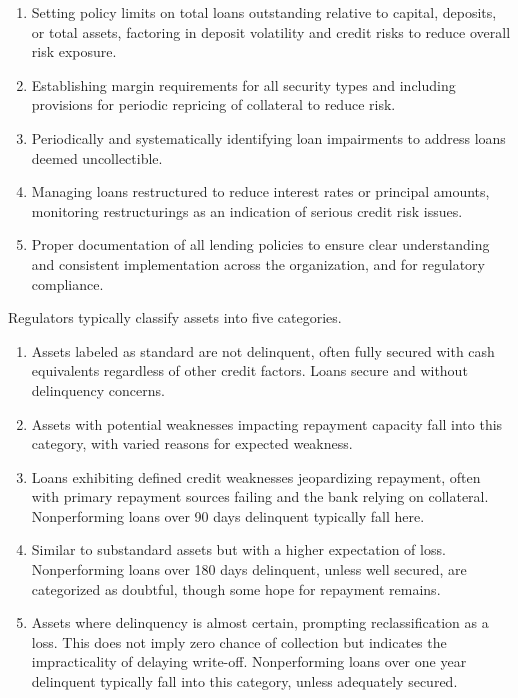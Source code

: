 \begin{enumerate}
delinquencies, including reporting to the board and determining potential losses
and alternative repayment plans.
\item {} Setting policy limits on total
loans outstanding relative to capital, deposits, or total assets, factoring in
deposit volatility and credit risks to reduce overall risk exposure.
\item {} Establishing margin requirements for
all security types and including provisions for periodic repricing of collateral
to reduce risk.
\item {} Periodically and systematically identifying
loan impairments to address loans deemed uncollectible.
\item {} Managing loans restructured to reduce
interest rates or principal amounts, monitoring restructurings as an indication
of serious credit risk issues.
\item {} Proper documentation of all lending
policies to ensure clear understanding and consistent implementation across the
organization, and for regulatory compliance.
\end{enumerate}


Regulators typically classify assets into five categories.

\begin{enumerate}
\item {} Assets labeled as standard are not delinquent,
often fully secured with cash equivalents regardless of other credit factors.
Loans secure and without delinquency concerns.
\item {} Assets with potential weaknesses
impacting repayment capacity fall into this category, with varied reasons for
expected weakness.
\item {} Loans exhibiting defined credit weaknesses
jeopardizing repayment, often with primary repayment sources failing and the bank
relying on collateral. Nonperforming loans over 90 days delinquent typically fall
here.
\item {} Similar to substandard assets but with a higher
expectation of loss. Nonperforming loans over 180 days delinquent, unless well
secured, are categorized as doubtful, though some hope for repayment remains.
\item {} Assets where delinquency is almost certain, prompting
reclassification as a loss. This does not imply zero chance of collection but
indicates the impracticality of delaying write-off. Nonperforming loans over one
year delinquent typically fall into this category, unless adequately secured.
\end{enumerate}

